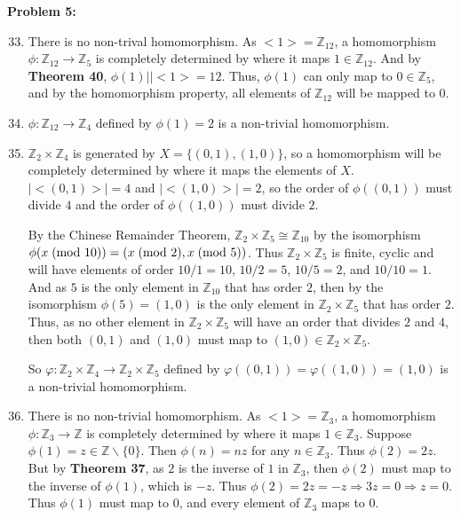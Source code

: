 \documentclass[12pt, letterpaper]{article}
\newenvironment{problem}
    [1]
    {\noindent \textbf{Problem #1:}}
    {\vspace{3mm}}
\begin{document}
\begin{problem}{5}
    \begin{enumerate}
        \setcounter{enumi}{32}
        \item There is no non-trival homomorphism. As ${<}1{>} = \mathbb{Z}_{12}$,
        a homomorphism $\phi: \mathbb{Z}_{12} \rightarrow \mathbb{Z}_5$ is completely
        determined by where it maps $1 \in \mathbb{Z}_{12}$. And by \textbf{Theorem 40}, 
        $\phi(1) | |{<}1{>} = 12$. Thus, $\phi(1)$ can only map to $0 \in \mathbb{Z}_5$,
        and by the homomorphism property, all elements of $\mathbb{Z}_{12}$ will be mapped
        to $0$.

        \item $\phi: \mathbb{Z}_{12} \rightarrow \mathbb{Z}_4$ defined by $\phi(1) = 2$
        is a non-trivial homomorphism.

        \item $\mathbb{Z}_2 \times \mathbb{Z}_4$ is generated by $X = \{(0,1), (1,0)\}$, so 
        a homomorphism will be completely determined by where it maps the elements of $X$.
        $|{<}(0,1){>}| = 4$ and $|{<}(1,0){>}| = 2$, so the order of $\phi((0,1))$
        must divide $4$ and the order of $\phi((1,0))$ must divide $2$.

        \bigskip\noindent
        By the Chinese Remainder Theorem, $\mathbb{Z}_2 \times \mathbb{Z}_5 \cong \mathbb{Z}_{10}$
        by the isomorphism $\phi(x \;(\text{mod 10}))\\ = (x \;(\text{mod 2}), x \;(\text{mod 5}))$.
        Thus $\mathbb{Z}_2 \times \mathbb{Z}_5$ is finite, cyclic and will have elements of order
        $10/1 = 10$, $10/2 = 5$, $10/5 = 2$, and $10/10 = 1$. And as $5$ is the only element in 
        $\mathbb{Z}_{10}$ that has order $2$, then by the isomorphism $\phi(5) = (1, 0)$ is the
        only element in $\mathbb{Z}_2 \times \mathbb{Z}_5$ that has order $2$. Thus, as no other
        element in $\mathbb{Z}_2 \times \mathbb{Z}_5$ will have an order that divides $2$ and $4$,
        then both $(0, 1)$ and $(1, 0)$ must map to $(1, 0) \in \mathbb{Z}_2 \times \mathbb{Z}_5$.

        \bigskip\noindent
        So $\varphi: \mathbb{Z}_2 \times \mathbb{Z}_4 \rightarrow \mathbb{Z}_2 \times \mathbb{Z}_5$
        defined by $\varphi((0, 1)) = \varphi((1, 0)) = (1, 0)$ is a non-trivial homomorphism.

        \item There is no non-trivial homomorphism. As ${<}1{>} = \mathbb{Z}_{3}$,
        a homomorphism $\phi: \mathbb{Z}_{3} \rightarrow \mathbb{Z}$ is completely
        determined by where it maps $1 \in \mathbb{Z}_{3}$. Suppose $\phi(1) = z \in \mathbb{Z} 
        \backslash \{0\}$. Then $\phi(n) = nz$ for any $n \in \mathbb{Z}_3$. Thus $\phi(2) = 2z$. 
        But by \textbf{Theorem 37}, as $2$ is the inverse of $1$ in $\mathbb{Z}_3$, then $\phi(2)$ 
        must map to the inverse of $\phi(1)$, which is $-z$. Thus $\phi(2) = 2z = -z \Rightarrow
        3z = 0 \Rightarrow z = 0$. Thus $\phi(1)$ must map to $0$, and every element
        of $\mathbb{Z}_3$ maps to $0$.


\end{enumerate}
\end{problem}
\end{document}
